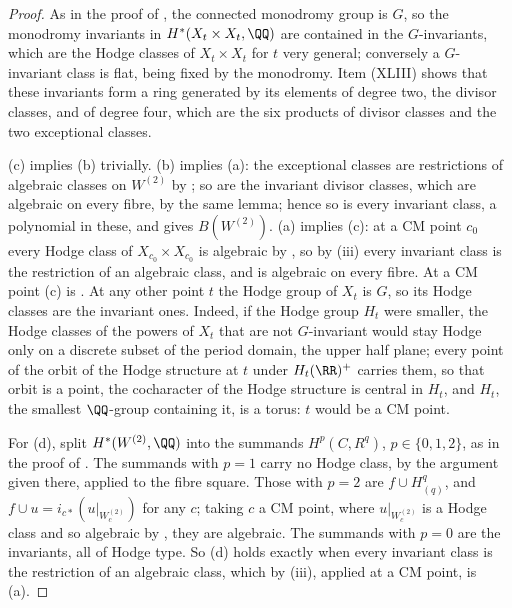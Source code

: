 \begin{proof}
As in the proof of , the connected monodromy group
is $G$, so the monodromy invariants in $H^{*}(X_{t}\times X_{t},\QQ)$ are
contained in the $G$-invariants, which are the Hodge classes of
$X_{t}\times X_{t}$ for $t$ very general; conversely a $G$-invariant class is
flat, being fixed by the monodromy. Item (XLIII) shows that these invariants
form a ring generated by its elements of degree two, the divisor classes, and
of degree four, which are the six products of divisor classes and the two
exceptional classes.

(c) implies (b) trivially. (b) implies (a): the exceptional classes are
restrictions of algebraic classes on $W^{(2)}$ by ; so are
the invariant divisor classes, which are algebraic on every fibre, by the
same lemma; hence so is every invariant class, a polynomial in these, and
 gives $B(W^{(2)})$. (a) implies (c): at a CM point
$c_{0}$ every Hodge class of $X_{c_{0}}\times X_{c_{0}}$ is algebraic by
, so by (iii) every
invariant class is the restriction of an algebraic class, and is algebraic on
every fibre. At a CM point (c) is . At any other point
$t$ the Hodge group of $X_{t}$ is $G$, so its Hodge classes are the
invariant ones. Indeed, if the Hodge group $H_{t}$ were smaller, the Hodge
classes of the powers of $X_{t}$ that are not $G$-invariant would stay Hodge
only on a discrete subset of the period domain, the upper half plane; every
point of the orbit of the Hodge structure at $t$ under $H_{t}(\RR)^{+}$
carries them, so that orbit is a point, the cocharacter of
the Hodge structure is central in $H_{t}$, and $H_{t}$, the smallest
$\QQ$-group containing it, is a torus: $t$ would be a CM point.

For (d), split $H^{*}(W^{(2)},\QQ)$ into the summands $H^{p}(C,R^{q})$,
$p\in\{0,1,2\}$, as in the proof of . The summands
with $p=1$ carry no Hodge class, by the argument given there, applied to the
fibre square. Those with $p=2$ are $f\cup H^{q}_{(q)}$, and
$f\cup u=i_{c*}(u|_{W^{(2)}_{c}})$ for any $c$; taking $c$ a CM point, where
$u|_{W^{(2)}_{c}}$ is a Hodge class and so algebraic by ,
they are algebraic. The summands with $p=0$ are the invariants, all of Hodge
type. So (d) holds exactly when every invariant class is the restriction of an
algebraic class, which by (iii), applied at a
CM point, is (a).
\end{proof}


